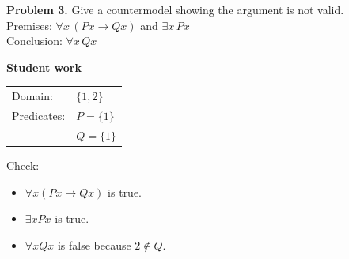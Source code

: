 \documentclass[11pt]{article}
\begin{document}
\noindent\textbf{Problem 3.} Give a countermodel showing the argument is not valid.\\[0.75em]

\noindent Premises: $\forall x\,(Px \to Qx)$ and $\exists x\,Px$\\
Conclusion: $\forall x\,Qx$

\vspace{1.0em}
\noindent\textbf{Student work}\\[0.4em]
\begin{tabular}{@{}ll@{}}
Domain: & $\{1,2\}$ \\
Predicates: & $P = \{1\}$ \\
 & $Q = \{1\}$
\end{tabular}

\vspace{1.0em}
\noindent Check:
\begin{itemize}
\item $\forall x(Px \to Qx)$ is true.
\item $\exists x Px$ is true.
\item $\forall x Qx$ is false because $2 \notin Q$.
\end{itemize}
\end{document}
